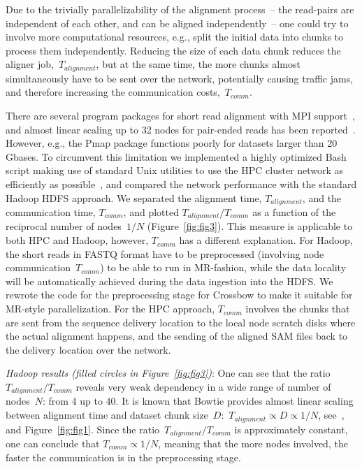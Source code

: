 \documentclass[10pt]{article}
\begin{document}
Due to the trivially parallelizability of the alignment process~-- the read-pairs are independent of each other, and can be aligned independently~-- one could try to involve more computational resources, e.g., split the initial data into chunks to process them independently.
Reducing the size of each data chunk reduces the aligner  job,~$T_{alignment}$, but at the same time, the more chunks almost simultaneously have to be sent over the network, potentially causing traffic jams, and therefore increasing the communication costs,~$T_{comm}$.

There are several program packages for short read alignment with MPI support~\cite{pmap, gnumap}, and almost linear scaling up to 32 nodes for pair-ended reads has been reported~\cite{Bozdag:2010cn}. However, e.g., the Pmap package functions poorly for datasets larger than 20 Gbases. To circumvent this limitation we implemented a highly optimized Bash script making use of standard Unix utilities to use the HPC cluster network as efficiently as possible~\cite{code_repo_bash}, and compared the network performance with the standard Hadoop HDFS approach. We separated the alignment time, $T_{alignment}$, and the communication time, $T_{comm}$, and plotted $T_{alignment}/T_{comm}$ as a function of the reciprocal number of nodes~$1/N$ (Figure~\ref{fig:fig3}). 
This measure is applicable to both HPC and Hadoop, however, $T_{comm}$ has a different explanation. For Hadoop, the short reads in FASTQ format have to be preprocessed (involving node communication~$T_{comm}$) to be able to run in MR-fashion, while the data locality will be automatically achieved during the data ingestion into the HDFS. 
We rewrote the code for the preprocessing stage for Crossbow to make it suitable for MR-style parallelization.
For the HPC approach, $T_{comm}$ involves the chunks that are sent from the sequence delivery location to the local node scratch disks where the actual alignment happens, and the sending of the aligned SAM files back to the delivery location over the network.


\textit{Hadoop results (filled circles in Figure~\ref{fig:fig3})}: One can see that the ratio~$T_{alignment}/T_{comm}$ reveals very weak dependency in a wide range of number of nodes~$N$: from 4 up to 40. It is known that Bowtie provides almost linear scaling between alignment time and dataset chunk size~$D$:~$T_{alignment}\propto  D\propto 1/N$, see~\cite{Langmead:2009uq}, and Figure~\ref{fig:fig1}. Since the ratio~$T_{alignment}/T_{comm}$ is approximately constant, one can conclude that $T_{comm}\propto 1/N$, meaning that the more nodes involved, the faster the communication is in the preprocessing stage.
\end{document}
